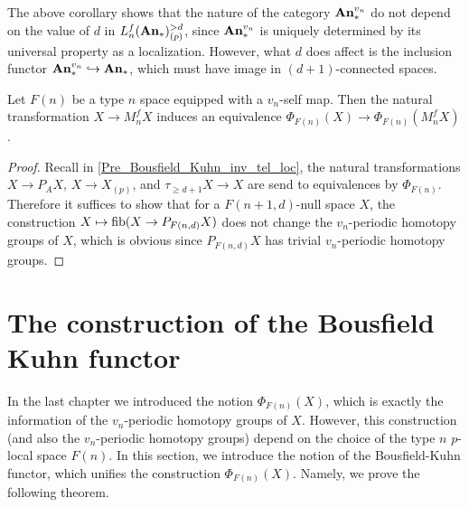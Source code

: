 	The above corollary shows that the nature of the category $\mathbf{An}_*^{v_n}$ do not depend on the value of $d$ in $L_n^f(\mathbf{An}_*)_{(p)}^{>d}$, since $\mathbf{An}_*^{v_n}$ is uniquely determined by its universal property as a localization. However, what $d$ does affect is the inclusion functor $\mathbf{An}_*^{v_n}\hookrightarrow\mathbf{An}_*$, which must have image in $(d+1)$-connected spaces. 

	\begin{thm}\label{Pre_Bousfield_Kuhn_inv_mono_loc}
		Let $F(n)$ be a type $n$ space equipped with a $v_n$-self map. Then the natural transformation $X\to M_n^fX$ induces an equivalence $\Phi_{F(n)}(X)\to\Phi_{F(n)}(M_n^fX)$. 
	\end{thm}
	\begin{proof}
		Recall in \cref{Pre_Bousfield_Kuhn_inv_tel_loc}, the natural transformations $X\to P_AX$, $X\to X_{(p)}$, and $\tau_{\geq d+1}X\to X$ are send to equivalences by $\Phi_{F(n)}$. Therefore it suffices to show that for a $F(n+1,d)$-null space $X$, the construction $X\mapsto\operatorname{\mathrm{fib}}(X\to P_{F(n,d)}X)$ does not change the $v_n$-periodic homotopy groups of $X$, which is obvious since $P_{F(n,d)}X$ has trivial $v_n$-periodic homotopy groups. 
	\end{proof}

\section{The construction of the Bousfield Kuhn functor}

	In the last chapter we introduced the notion $\Phi_{F(n)}(X)$, which is exactly the information of the $v_n$-periodic homotopy groups of $X$. However, this construction (and also the $v_n$-periodic homotopy groups) depend on the choice of the type $n$ $p$-local space $F(n)$. In this section, we introduce the notion of the Bousfield-Kuhn functor, which unifies the construction $\Phi_{F(n)}(X)$. Namely, we prove the following theorem. 
	
